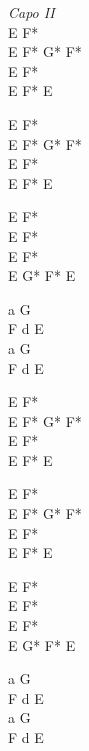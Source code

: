 \begin{chord}
    \textit{Capo II}\\
    E F*\\
    E F* G* F*\\
    E F*\\
    E F* E

    E F*\\
    E F* G* F*\\
    E F*\\
    E F* E

    E F*\\
    E F*\\
    E F*\\
    E G* F* E

    a G\\
    F d E\\
    a G\\
    F d E

    E F*\\
    E F* G* F*\\
    E F*\\
    E F* E

    E F*\\
    E F* G* F*\\
    E F*\\
    E F* E

    E F*\\
    E F*\\
    E F*\\
    E G* F* E

    a G\\
    F d E\\
    a G\\
    F d E
\end{chord}